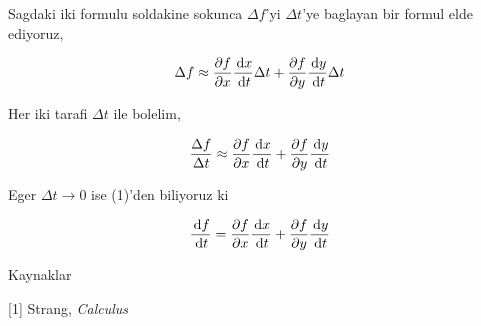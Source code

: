 \documentclass[12pt,fleqn]{article}\usepackage{../../common}
\begin{document}
Sagdaki iki formulu soldakine sokunca $\Delta f$'yi $\Delta t$'ye baglayan
bir formul elde ediyoruz,

$$
\Delta f \approx
\frac{\partial f}{\partial x} \frac{\,\mathrm{d} x}{\,\mathrm{d} t} \Delta t +
\frac{\partial f}{\partial y} \frac{\,\mathrm{d} y}{\,\mathrm{d} t} \Delta t
$$

Her iki tarafi $\Delta t$ ile bolelim,

$$
\frac{\Delta f}{\Delta t} \approx
\frac{\partial f}{\partial x} \frac{\,\mathrm{d} x}{\,\mathrm{d} t} +
\frac{\partial f}{\partial y} \frac{\,\mathrm{d} y}{\,\mathrm{d} t}
$$

Eger $\Delta t \to 0$ ise (1)'den biliyoruz ki 

$$
\frac{\,\mathrm{d} f}{\,\mathrm{d} t} =
\frac{\partial f}{\partial x} \frac{\,\mathrm{d} x}{\,\mathrm{d} t} +
\frac{\partial f}{\partial y} \frac{\,\mathrm{d} y}{\,\mathrm{d} t}
$$

Kaynaklar

[1] Strang, {\em Calculus}
\end{document}
